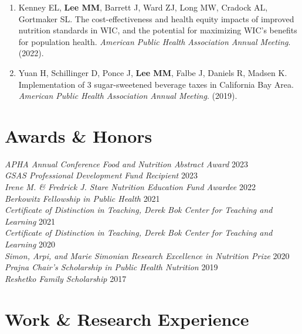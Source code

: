 \documentclass{cv_style}
\begin{document}
\begin{enumerate}[leftmargin = 2em]
    \item \parskip 1pt Kenney EL, \textbf{Lee MM}, Barrett J, Ward ZJ, Long MW, Cradock AL, Gortmaker SL. The cost-effectiveness and health equity impacts of improved nutrition standards in WIC, and the potential for maximizing WIC’s benefits for population health. \textit{American Public Health Association Annual Meeting}. (2022).
    \item \parskip 1pt Yuan H, Schillinger D, Ponce J, \textbf{Lee MM},  Falbe J, Daniels R, Madsen K. Implementation of 3 sugar-sweetened beverage taxes in California Bay Area. \textit{American Public Health Association Annual Meeting}. (2019).
\end{enumerate}





\section{Awards \& Honors}

\textit{APHA Annual Conference Food and Nutrition Abstract Award} \hfill {2023}\\
\textit{GSAS Professional Development Fund Recipient} \hfill {2023}\\
\textit{Irene M. \& Fredrick J. Stare Nutrition Education Fund Awardee} \hfill {2022}\\
\textit{Berkowitz Fellowship in Public Health} \hfill {2021}\\
\textit{Certificate of Distinction in Teaching, Derek Bok Center for Teaching and Learning} \hfill {2021}\\
\textit{Certificate of Distinction in Teaching, Derek Bok Center for Teaching and Learning} \hfill {2020}\\
\textit{Simon, Arpi, and Marie Simonian Research Excellence in Nutrition Prize} \hfill {2020} \\
\textit{Prajna Chair's Scholarship in Public Health Nutrition} \hfill 2019 \\
\textit{Reshetko Family Scholarship} \hfill 2017


\section{Work \& Research Experience}
\end{document}
